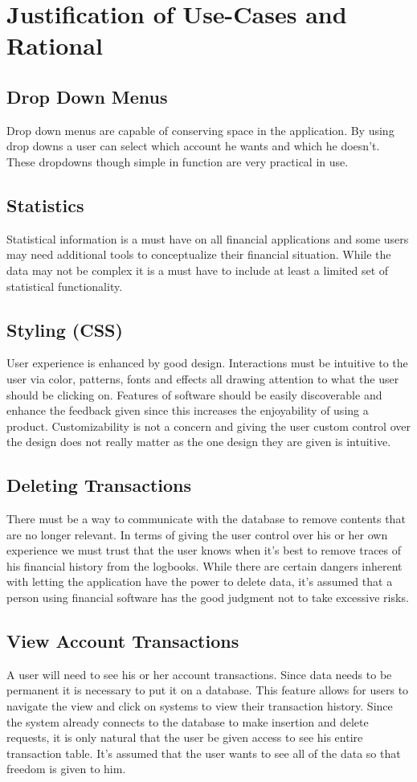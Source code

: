 \documentclass[12pt]{article}
\begin{document}
\section{Justification of Use-Cases and Rational}
\subsection{Drop Down Menus}
	Drop down menus are capable of conserving space in the application. By using drop downs a user can select which account he wants and which he doesn't. These dropdowns though simple in function are very practical in use.
\subsection{Statistics}
	 Statistical information is a must have on all financial applications and some users may need additional tools to conceptualize their financial situation. While the data may not be complex it is a must have to include at least a limited set of statistical functionality.
\subsection{Styling (CSS)}
	User experience is enhanced by good design. Interactions must be intuitive to the user via color, patterns, fonts and effects all drawing attention to what the user should be clicking on. Features of software should be easily discoverable and enhance the feedback given since this increases the enjoyability of using a product. Customizability is not a concern and giving the user custom control over the design does not really matter as the one design they are given is intuitive.
\subsection{Deleting Transactions}
	There must be a way to communicate with the database to remove contents that are no longer relevant. In terms of giving the user control over his or her own experience we must trust that the user knows when it's best to remove traces of his financial history from the logbooks. While there are certain dangers inherent with letting the application have the power to delete data, it's assumed that a person using financial software has the good judgment not to take excessive risks.
\subsection{View Account Transactions}
	A user will need to see his or her account transactions. Since data needs to be permanent it is necessary to put it on a database. This feature allows for users to navigate the view and click on systems to view their transaction history. Since the system already connects to the database to make insertion and delete requests, it is only natural that the user be given access to see his entire transaction table. It's assumed that the user wants to see all of the data so that freedom is given to him.
\end{document}
